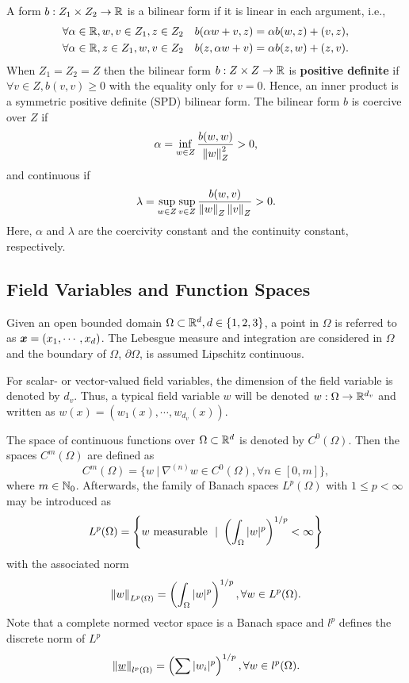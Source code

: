 A form $b: Z_1 \times Z_2 \rightarrow {\mathbb{ R}}$ is a bilinear form if it is linear in each argument, i.e.,
\begin{align}
	\forall \alpha \in {\mathbb{ R}}, w,v \in Z_1, z \in Z_2 &  & b(\alpha w +v,z) & = \alpha b(w,z) + (v,z), \nonumber \\
	\forall \alpha \in {\mathbb{ R}}, z \in Z_1, w,v \in Z_2 &  & b(z,\alpha w +v) & = \alpha b(z,w) + (z,v).
\end{align}
When $Z_1=Z_2=Z$ then the bilinear form $b: Z \times Z \rightarrow {\mathbb{ R}}$ is \textbf{positive definite} if $\forall v \in Z, b(v,v)\geq 0$ with the equality only for $v=0$. Hence, an inner product is a symmetric positive definite (SPD) bilinear form.
The bilinear form $b$ is coercive over $Z$ if
\begin{equation}
	\alpha = \inf_{w\in Z} \frac{b(w,w)}{\left\lVert w \right\rVert_{Z}^{2}} > 0,
\end{equation}
and continuous if
\begin{equation}
	\lambda = \sup_{w\in Z} \sup_{v\in Z} \frac{b(w,v)}{\left\lVert w \right\rVert_{Z} \left\lVert v \right\rVert_{Z}} > 0.
\end{equation}
Here, $\alpha$ and $\lambda$ are the coercivity constant and the continuity constant, respectively.

\subsection{Field Variables and Function Spaces}
Given an open bounded domain $\Omega \subset {\mathbb{ R}}^d, d \in \{1,2,3\}$, a point in $\Omega$ is referred to as $\mbox{$\bm  x$}=(x_1,\cdots,x_d)$. The Lebesgue measure and integration are considered in $\Omega$ and the boundary of $\Omega$, $\partial\Omega$, is assumed Lipschitz continuous.

For scalar- or vector-valued field variables, the dimension of the field variable is denoted by $d_v$. Thus, a typical field variable $w$ will be denoted $w: \Omega \rightarrow {\mathbb{ R}}^{d_v}$ and written as $w(x)=(w_1(x),\cdots,w_{d_v}(x))$.

The space of continuous functions over $\Omega \subset {\mathbb{ R}}^d$ is denoted by $C^0(\Omega)$. Then the spaces $C^m(\Omega)$ are defined as
\begin{equation}
	C^m(\Omega) = \{ w \ | \ \nabla^{(n)}{w} \in C^0(\Omega), \forall n \in [0,m] \},
\end{equation}
where $m \in {\mathbb{ N}}_0$. Afterwards, the family of Banach spaces $L^p(\Omega)$ with $1 \leq p < \infty$ may be introduced as
\begin{equation}
	L^p(\Omega) = \left \{ {w \text{ measurable } \ | \ \left( \int_{\Omega} |w|^p \right)^{1/p} < \infty} \right \}
\end{equation}
with the associated norm
\begin{equation}
	\left\lVert w \right\rVert_{L^p(\Omega)} = \left( \int_{\Omega} |w|^p \right)^{1/p}, \forall w \in L^p(\Omega).
\end{equation}
Note that a complete normed vector space is a Banach space and $l^p$ defines the discrete norm of $L^p$
\begin{equation}
	\left\lVert \underline{w} \right\rVert_{l^p(\Omega)} = \left( \sum |w_i|^p \right)^{1/p}, \forall w \in l^p(\Omega).
\end{equation}

